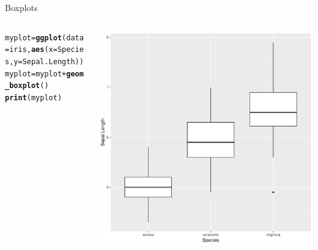 \documentclass[aspectratio=169]{beamer}\usepackage[]{graphicx}\usepackage[]{color}
\makeatletter
\def\maxwidth{ %
  \ifdim\Gin@nat@width>\linewidth
    \linewidth
  \else
    \Gin@nat@width
  \fi
}
\newcommand{\hlopt}[1]{\textcolor[rgb]{0,0,0}{#1}}%
\newcommand{\hlstd}[1]{\textcolor[rgb]{0.345,0.345,0.345}{#1}}%
\newcommand{\hlkwb}[1]{\textcolor[rgb]{0.69,0.353,0.396}{#1}}%
\newcommand{\hlkwc}[1]{\textcolor[rgb]{0.333,0.667,0.333}{#1}}%
\newcommand{\hlkwd}[1]{\textcolor[rgb]{0.737,0.353,0.396}{\textbf{#1}}}%
\newenvironment{kframe}{%
 \def\at@end@of@kframe{}%
 \ifinner\ifhmode%
  \def\at@end@of@kframe{\end{minipage}}%
  \begin{minipage}{\columnwidth}%
 \fi\fi%
 \def\FrameCommand##1{\hskip\@totalleftmargin \hskip-\fboxsep
 \colorbox{shadecolor}{##1}\hskip-\fboxsep
     \hskip-\linewidth \hskip-\@totalleftmargin \hskip\columnwidth}%
 \MakeFramed {\advance\hsize-\width
   \@totalleftmargin\z@ \linewidth\hsize
   \@setminipage}}%
 {\par\unskip\endMakeFramed%
 \at@end@of@kframe}
\newenvironment{knitrout}{}{} %
\makeatother
\begin{document}
\begin{frame}[fragile]{Boxplots}
\begin{columns}
  \begin{column}{0.50\textwidth}
\begin{knitrout}\tiny
{}\color{fgcolor}\begin{kframe}
\begin{alltt}
\hlstd{myplot} \hlkwb{=} \hlkwd{ggplot}\hlstd{(}\hlkwc{data}\hlstd{=iris,} \hlkwd{aes}\hlstd{(}\hlkwc{x}\hlstd{=Species,} \hlkwc{y}\hlstd{=Sepal.Length))}
\hlstd{myplot} \hlkwb{=} \hlstd{myplot} \hlopt{+} \hlkwd{geom_boxplot}\hlstd{()}
\hlkwd{print}\hlstd{(myplot)}
\end{alltt}
\end{kframe}
\end{knitrout}
  \end{column}
  \begin{column}{0.5\textwidth}
\begin{knitrout}\scriptsize
{}\color{fgcolor}
\includegraphics[width=\maxwidth]{figure/unnamed-chunk-21-1} 

\end{knitrout}
  \end{column}
\end{columns}
\end{frame}
\end{document}
